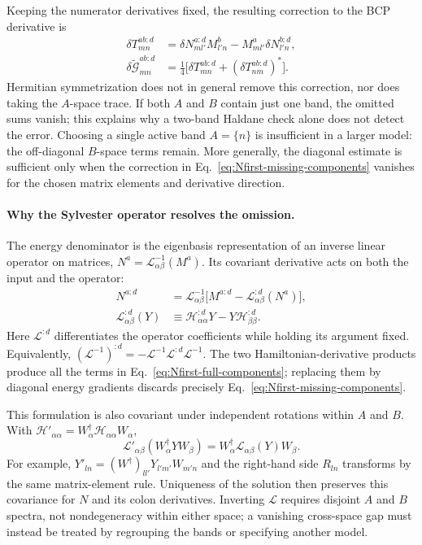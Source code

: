 \documentclass[prx,amsmath,amssymb,superscriptaddress,longbibliography]{revtex4-2}
\begin{document}
Keeping the numerator derivatives fixed, the resulting correction to the
BCP derivative is
\begin{align}
 \delta T_{mn}^{ab:d}
 &=\delta N_{ml'}^{a:d}M_{l'n}^b
   -M_{ml'}^a\delta N_{l'n}^{b:d},\nonumber\\
 \delta\widetilde{\mathcal G}_{mn}^{ab:d}
 &=\tfrac14\big[\delta T_{mn}^{ab:d}
                    +(\delta T_{nm}^{ab:d})^*\big].
 \label{eq:DerBCP-missing-components}
\end{align}
Hermitian symmetrization does not in general remove this correction, nor
does taking the $A$-space trace. If both $A$ and $B$ contain just one band,
the omitted sums vanish; this explains why a two-band Haldane check alone
does not detect the error. Choosing a single active band $A=\{n\}$ is
insufficient in a larger model: the off-diagonal $B$-space terms remain.
More generally, the diagonal estimate is sufficient only when the
correction in Eq.~\eqref{eq:Nfirst-missing-components} vanishes for the
chosen matrix elements and derivative direction.

\paragraph{Why the Sylvester operator resolves the omission.}
The energy denominator is the eigenbasis representation of an inverse
linear operator on matrices, $N^a=\mathscr L_{\alpha\beta}^{-1}(M^a)$.
Its covariant derivative acts on both the input and the operator:
\begin{align}
 N^{a:d}
 &=\mathscr L_{\alpha\beta}^{-1}
    \big[M^{a:d}-\mathscr L_{\alpha\beta}^{:d}(N^a)\big],\nonumber\\
 \mathscr L_{\alpha\beta}^{:d}(Y)
 &\equiv\mathcal H_{\alpha\alpha}^{:d}Y
            -Y\mathcal H_{\beta\beta}^{:d}.
 \label{eq:sylvester-inverse-derivative}
\end{align}
Here $\mathscr L^{:d}$ differentiates the operator coefficients while
holding its argument fixed. Equivalently,
$(\mathscr L^{-1})^{:d}=-\mathscr L^{-1}\mathscr L^{:d}\mathscr L^{-1}$.
The two Hamiltonian-derivative products produce all the terms in
Eq.~\eqref{eq:Nfirst-full-components}; replacing them by diagonal energy
gradients discards precisely Eq.~\eqref{eq:Nfirst-missing-components}.

This formulation is also covariant under independent rotations within
$A$ and $B$. With $\mathcal H'_{\alpha\alpha}
=W_\alpha^\dagger\mathcal H_{\alpha\alpha}W_\alpha$,
\begin{equation}
 \mathscr L'_{\alpha\beta}(W_\alpha^\dagger YW_\beta)
 =W_\alpha^\dagger\mathscr L_{\alpha\beta}(Y)W_\beta.
 \label{eq:sylvester-covariance}
\end{equation}
For example, $Y'_{ln}=(W^\dagger)_{ll'}Y_{l'm'}W_{m'n}$ and the right-hand
side $R_{ln}$ transforms by the same matrix-element rule. Uniqueness of
the solution then preserves this covariance for $N$ and its colon
derivatives. Inverting $\mathscr L$ requires disjoint $A$ and $B$ spectra,
not nondegeneracy within either space; a vanishing cross-space gap must
instead be treated by regrouping the bands or specifying another model.
\end{document}
